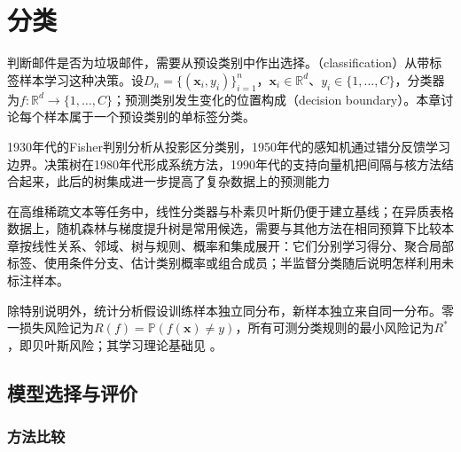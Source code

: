 \chapter{分类}
\label{chap:classification}

判断邮件是否为垃圾邮件，需要从预设类别中作出选择。（classification）从带标签样本学习这种决策。设$D_n=\{(\bm{x}_i,y_i)\}_{i=1}^{n}$，$\bm{x}_i\in\mathbb{R}^{d}$、$y_i\in\{1,\dots,C\}$，分类器为$f:\mathbb{R}^{d}\to\{1,\dots,C\}$；预测类别发生变化的位置构成（decision boundary）。本章讨论每个样本属于一个预设类别的单标签分类。

1930年代的Fisher判别分析从投影区分类别，1950年代的感知机通过错分反馈学习边界。决策树在1980年代形成系统方法，1990年代的支持向量机把间隔与核方法结合起来，此后的树集成进一步提高了复杂数据上的预测能力

在高维稀疏文本等任务中，线性分类器与朴素贝叶斯仍便于建立基线；在异质表格数据上，随机森林与梯度提升树是常用候选，需要与其他方法在相同预算下比较本章按线性关系、邻域、树与规则、概率和集成展开：它们分别学习得分、聚合局部标签、使用条件分支、估计类别概率或组合成员；半监督分类随后说明怎样利用未标注样本。

除特别说明外，统计分析假设训练样本独立同分布，新样本独立来自同一分布。零一损失风险记为$R(f)=\mathbb{P}(f(\bm{x})\ne y)$，所有可测分类规则的最小风险记为$R^\ast$，即贝叶斯风险；其学习理论基础见
。









\section{模型选择与评价}
\label{sec:classification-evaluation}

\subsection{方法比较}

